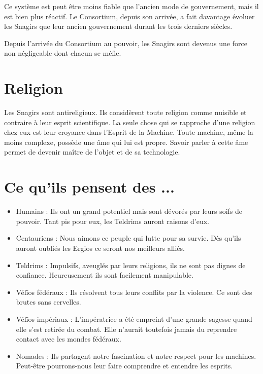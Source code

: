\begin{multicols}{2}
Ce système est peut être moins fiable que l'ancien mode de gouvernement, mais il est bien plus réactif. Le Consortium, depuis son arrivée, a fait davantage évoluer les Snagirs que leur ancien gouvernement durant les trois derniers siècles.

Depuis l'arrivée du Consortium au pouvoir, les Snagirs sont devenus une force non négligeable dont chacun se méfie.

\section{Religion}

Les Snagirs sont antireligieux. Ils considèrent toute religion comme nuisible et contraire à leur esprit scientifique. La seule chose qui se rapproche d'une religion chez eux est leur croyance dans l'Esprit de la Machine. Toute machine, même la moins complexe, possède une âme qui lui est propre. Savoir parler à cette âme permet de devenir maître de l'objet et de sa technologie.

\section{Ce qu'ils pensent des ...}

\begin{itemize}
\item Humains : Ils ont un grand potentiel mais sont dévorés par leurs soifs de pouvoir. Tant pis pour eux, les Teldrims auront raisons d'eux.
\item Centauriens : Nous aimons ce peuple qui lutte pour sa survie. Dès qu'ils auront oubliés les Ergios ce seront nos meilleurs alliés.
\item Teldrims : Impulsifs, aveuglés par leurs religions, ils ne sont pas dignes de confiance. Heureusement ils sont facilement manipulable.
\item Vélïos fédéraux : Ils résolvent tous leurs conflits par la violence. Ce sont des brutes sans cervelles.
\item Vélïos impériaux : L'impératrice a été empreint d'une grande sagesse quand elle s'est retirée du combat. Elle n'aurait toutefois jamais du reprendre contact avec les mondes fédéraux.
\item Nomades : Ils partagent notre fascination et notre respect pour les machines. Peut-être pourrons-nous leur faire comprendre et entendre les esprits.
\end{itemize}

\end{multicols}

